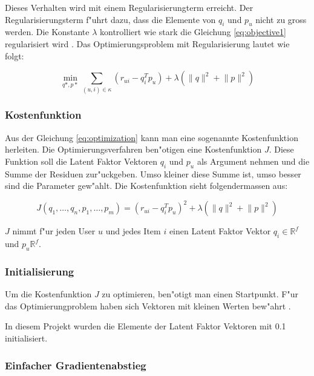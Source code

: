\documentclass[a4paper, 12pt]{article}
\begin{document}
 Dieses Verhalten wird mit einem Regularisierungterm erreicht. Der Regularisierungsterm f"uhrt dazu, dass die Elemente von $q_i$ und $p_u$ nicht zu gross werden. Die Konstante $\lambda$ kontrolliert wie stark die Gleichung \ref{eq:objective1} regularisiert wird \cite{koren2009}. Das Optimierungsproblem mit Regularisierung lautet wie folgt:

\begin{equation}
  \label{eq:optimization}
      \min_{q*,p*} \sum_{(u,i) \in \kappa} (r_{ui} - q_i^T p_u) + \lambda (\lVert q \rVert^2 + \lVert p \lVert ^2)
\end{equation}

\subsubsection{Kostenfunktion}
\label{sec:opt}

Aus der Gleichung \ref{eq:optimization} kann man eine sogenannte Kostenfunktion herleiten. Die Optimierungsverfahren ben"otigen eine Kostenfunktion $J$. Diese Funktion soll die Latent Faktor Vektoren $q_i$ und $p_u$ als Argument nehmen und die Summe der Residuen zur"uckgeben. Umso kleiner diese Summe ist, umso besser sind die Parameter gew"ahlt. Die Kostenfunktion sieht folgendermassen aus:

\begin{equation}
  \label{eq:costfunction}
  J(q_1, \dots , q_n, p_1, \dots, p_m) =  (r_{ui} - q_i^T p_u)^2 + \lambda (\lVert q \rVert^2 + \lVert p \lVert ^2)
\end{equation}

$J$ nimmt f"ur jeden User $u$ und jedes Item $i$ einen Latent Faktor Vektor $q_i \in \mathbb{R}^f$ und $p_u \mathbb{R}^f$.

\subsubsection{Initialisierung}
\label{sec:init}

Um die Kostenfunktion $J$ zu optimieren, ben"otigt man einen Startpunkt. F"ur das Optimierungproblem \label{eq:objective} haben sich Vektoren mit kleinen Werten bew"ahrt \cite{Takacs08}. 

In diesem Projekt wurden die Elemente der Latent Faktor Vektoren mit 0.1 initialisiert.

\subsubsection{Einfacher Gradientenabstieg}
\label{sec:gradientdescent}
 
\end{document}
